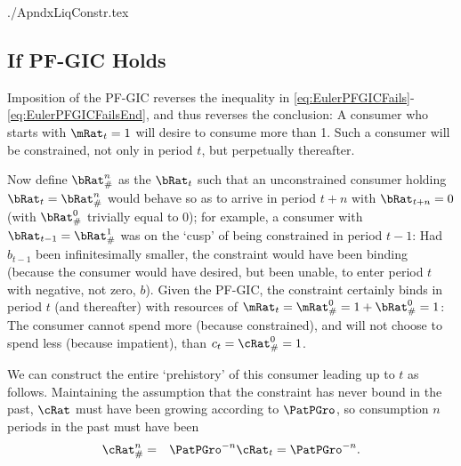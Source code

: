 \documentclass{econtex}
\begin{document}
\begin{verbatimwrite}{./ApndxLiqConstr.tex}
\subsection{If PF-GIC Holds}

Imposition of the PF-GIC reverses the inequality in
\eqref{eq:EulerPFGICFails}-\eqref{eq:EulerPFGICFailsEnd}, and thus
reverses the conclusion: A consumer who starts with $\mRat_{t}=1$ will
desire to consume more than 1.  Such a consumer will be constrained,
not only in period $t$, but perpetually thereafter.

Now define $\bRat_{\#}^{n}$ as the $\bRat_{t}$ such that
an unconstrained consumer holding $\bRat_{t}=\bRat_{\#}^{n}$ would behave so as to arrive in period $t+n$ with $\bRat_{t+n}=0$ (with $\bRat_{\#}^{0}$ trivially equal to 0); for example, a consumer with $\bRat_{t-1}=\bRat_{\#}^{1}$ was on the `cusp' of being constrained in period
$t-1$: Had $b_{t-1}$ been infinitesimally smaller, the constraint
would have been binding (because the consumer would have desired, but
been unable, to enter period $t$ with negative, not zero, $b$).  Given
the PF-GIC, the constraint certainly binds in period $t$ (and
thereafter) with resources of
$\mRat_{t}=\mRat_{\#}^{0}=1+\bRat_{\#}^{0}=1$: The consumer cannot
spend more (because constrained), and will not choose to spend less
(because impatient), than $c_{t}=\cRat_{\#}^{0}=1$.

We can construct the entire `prehistory' of this consumer leading up to $t$ as follows.
Maintaining the assumption that the constraint has never bound in the past,
$\cRat$ must have been growing according to $\PatPGro$, so consumption $n$ periods in the past must have been
\begin{eqnarray}
  \cRat_{\#}^{n} & = & \PatPGro^{-n} \cRat_{t} = \PatPGro^{-n}. \label{eq:cPreHist}
\end{eqnarray}


\end{verbatimwrite}
\end{document}

